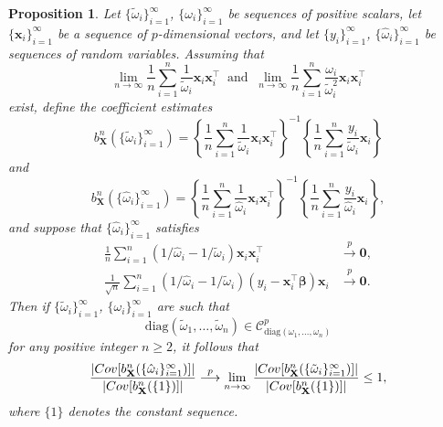 \documentclass[12pt]{article}
\newtheorem{proposition}{Proposition}
\newcommand{\Cov}[1]{{\rm{Cov}}[ #1 ]}
\newcommand{\bl}[1]{{\mathbf #1}}
\newcommand{\bs}[1]{\boldsymbol #1}
\begin{document}
\begin{proposition}\label{prop:consistency}
{Let $\{\tilde{\omega}_i\}_{i=1}^{\infty}$, $\{\omega_i\}_{i=1}^{\infty}$ be sequences of positive scalars, let $\{\bl{x}_i\}_{i=1}^{\infty}$ be a sequence of $p$-dimensional vectors, and let $\{y_i\}_{i=1}^\infty$, $\{\hat{\omega}_i\}_{i=1}^{\infty}$ be sequences of random variables. Assuming that
\begin{equation*}
    \lim_{n \rightarrow \infty}\frac{1}{n}\sum_{i=1}^{n} \frac{1}{\tilde{\omega}_i}\bl{x}_i \bl{x}_i^\top~\text{ and }~\lim_{n \rightarrow \infty}\frac{1}{n}\sum_{i=1}^{n} \frac{\omega_i}{\tilde{\omega}^2_i}\bl{x}_i \bl{x}_i^\top
\end{equation*}}
exist, define the coefficient estimates
\begin{equation*}
    b^{n}_{\bl{X}}(\{\tilde{\omega}_i\}_{i=1}^{\infty}) = \left\{\frac{1}{n}\sum_{i=1}^{n} \frac{1}{\tilde{\omega}_i}\bl{x}_i \bl{x}_i^\top \right\}^{-1} \left\{\frac{1}{n}\sum_{i=1}^{n} \frac{y_i}{\tilde{\omega}_i}\bl{x}_i \right\}
\end{equation*}
and
\begin{equation*}
    b^{n}_{\bl{X}}(\{\hat{\omega}_i\}_{i=1}^\infty) = \left\{\frac{1}{n}\sum_{i=1}^{n} \frac{1}{\hat{\omega}_i}\bl{x}_i \bl{x}_i^\top \right\}^{-1} \left\{\frac{1}{n}\sum_{i=1}^{n} \frac{y_i}{\hat{\omega}_i}\bl{x}_i \right\},
\end{equation*}
and suppose that $\{\hat{\omega}_i\}_{i=1}^\infty$ satisfies
\begin{equation*}
\begin{aligned}
    \frac{1}{n} \sum_{i=1}^n (1/\hat{\omega}_i - 1/\tilde{\omega}_i)\bl{x}_i \bl{x}_i^\top &\overset{p}{\longrightarrow} \bl{0}, \\
    \frac{1}{\sqrt{n}} \sum_{i=1}^n (1/\hat{\omega}_i - 1/\tilde{\omega}_i)(y_i - \bl{x}_i^\top\bs{\beta}) \bl{x}_i &\overset{p}{\longrightarrow} \bl{0}.
\end{aligned}
\end{equation*}
Then if $\{\tilde{\omega}_i\}_{i=1}^{\infty}$, $\{\omega_i\}_{i=1}^{\infty}$ are such that
\begin{equation*}
    \mathrm{diag}(\tilde{\omega}_1, \dots, \tilde{\omega}_n) \in \mathcal{C}^p_{\mathrm{diag}({\omega}_1, \dots, \omega_n)}
\end{equation*}
for any positive integer $n \geq 2$, it follows that
\begin{equation*}
    \frac{|\Cov{ b^{n}_{\bl{X}}(\{\hat{\omega}_i\}_{i=1}^{\infty})}|}{|\Cov{ b^n_{\bl{X}}(\{1\})}|} \overset{p}{\longrightarrow} \lim_{n \rightarrow \infty}\frac{|\Cov{ b^{n}_{\bl{X}}(\{\tilde{\omega}_i\}_{i=1}^{\infty})}|}{|\Cov{ b^n_{\bl{X}}(\{1\})}|} \leq 1,
\end{equation*}
where $\{1\}$ denotes the constant sequence.
\end{proposition}
\end{document}
